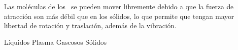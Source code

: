 
\question Las moléculas de los \fillin\ se pueden mover libremente debido a
  que la fuerza de atracción son más débil que en los sólidos, lo que permite
  que tengan mayor libertad de rotación y traslación, además de la vibración.

  \begin{oneparchoices}
    \CorrectChoice Líquidos
    \choice Plasma
    \choice Gaseosos
    \choice Sólidos
  \end{oneparchoices}
  \answerline[A]
